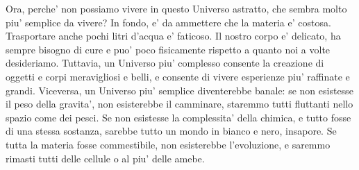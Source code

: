 Ora, perche' non possiamo vivere in questo Universo astratto, che sembra molto piu' semplice da vivere? In fondo, e' da ammettere che la materia e' costosa. Trasportare anche pochi litri d'acqua e' faticoso. Il nostro corpo e' delicato, ha sempre bisogno di cure e puo' poco fisicamente rispetto a quanto noi a volte desideriamo. Tuttavia, un Universo piu' complesso consente la creazione di oggetti e corpi meravigliosi e belli, e consente di vivere esperienze piu' raffinate e grandi. Viceversa, un Universo piu' semplice diventerebbe banale: se non esistesse il peso della gravita', non esisterebbe il camminare, staremmo tutti fluttanti nello spazio come dei pesci. Se non esistesse la complessita' della chimica, e tutto fosse di una stessa sostanza, sarebbe tutto un mondo in bianco e nero, insapore. Se tutta la materia fosse commestibile, non esisterebbe l'evoluzione, e saremmo rimasti tutti delle cellule o al piu' delle amebe. 

